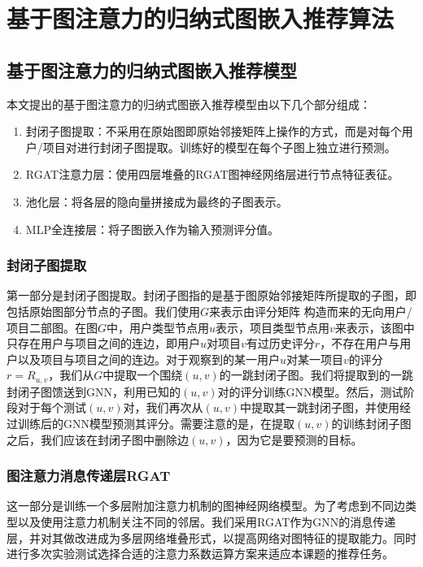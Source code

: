 \documentclass{ctexart}
\begin{document}
\section{基于图注意力的归纳式图嵌入推荐算法}

\subsection{基于图注意力的归纳式图嵌入推荐模型}

本文提出的基于图注意力的归纳式图嵌入推荐模型由以下几个部分组成：
\begin{enumerate}
    \item 封闭子图提取：不采用在原始图即原始邻接矩阵上操作的方式，而是对每个用户/项目对进行封闭子图提取。训练好的模型在每个子图上独立进行预测。
    \item RGAT注意力层：使用四层堆叠的RGAT图神经网络层进行节点特征表征。
    \item 池化层：将各层的隐向量拼接成为最终的子图表示。
    \item MLP全连接层：将子图嵌入作为输入预测评分值。
\end{enumerate}

\subsubsection{封闭子图提取}
第一部分是封闭子图提取。封闭子图指的是基于图原始邻接矩阵所提取的子图，即包括原始图部分节点的子图。我们使用$G$来表示由评分矩阵 构造而来的无向用户/项目二部图。在图$G$中，用户类型节点用$u$表示，项目类型节点用$v$来表示，该图中只存在用户与项目之间的连边，即用户$u$对项目$v$有过历史评分$r$，不存在用户与用户以及项目与项目之间的连边。对于观察到的某一用户$u$对某一项目$v$的评分$r=R_{u,v}$，我们从$G$中提取一个围绕$(u,v)$的一跳封闭子图。我们将提取到的一跳封闭子图馈送到GNN，利用已知的$(u,v)$对的评分训练GNN模型。然后，测试阶段对于每个测试$(u,v)$对，我们再次从$(u,v)$中提取其一跳封闭子图，并使用经过训练后的GNN模型预测其评分。需要注意的是，在提取$(u,v)$的训练封闭子图之后，我们应该在封闭子图中删除边$(u,v)$，因为它是要预测的目标。

\subsubsection{图注意力消息传递层RGAT}
这一部分是训练一个多层附加注意力机制的图神经网络模型。为了考虑到不同边类型以及使用注意力机制关注不同的邻居。我们采用RGAT作为GNN的消息传递层，并对其做改进成为多层网络堆叠形式，以提高网络对图特征的提取能力。同时进行多次实验测试选择合适的注意力系数运算方案来适应本课题的推荐任务。
\end{document}
